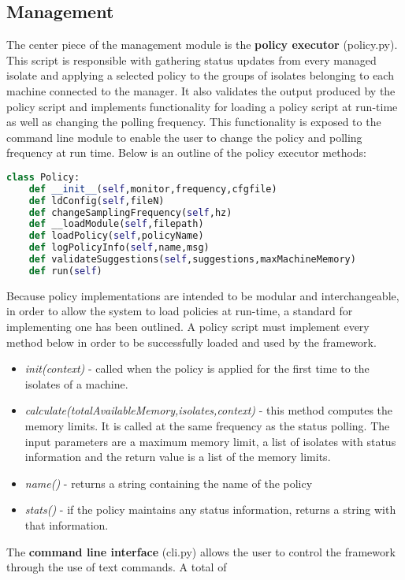 \documentclass{l4proj}
\begin{document}
\subsection{Management}
\hspace*{3em} The center piece of the management module is the \textbf{policy executor} (policy.py). This script is responsible with gathering status updates from every managed isolate and applying a selected policy to the groups of isolates belonging to each machine connected to the manager. It also validates the output produced by the policy script and implements functionality for loading a policy script at run-time as well as changing the polling frequency. This functionality is exposed to the command line module to enable the user to change the policy and polling frequency at run time. Below is an outline of the policy executor methods:
\begin{lstlisting}[language=python]
class Policy:
    def __init__(self,monitor,frequency,cfgfile)
    def ldConfig(self,fileN)
    def changeSamplingFrequency(self,hz)
    def __loadModule(self,filepath)
    def loadPolicy(self,policyName)
    def logPolicyInfo(self,name,msg)
    def validateSuggestions(self,suggestions,maxMachineMemory)
    def run(self)
\end{lstlisting}
\hspace*{3em} Because policy implementations are intended to be modular and interchangeable, in order to allow the system to load policies at run-time, a standard for implementing one has been outlined. A policy script must implement every method below in order to be successfully loaded and used by the framework. 
\begin{itemize}
\item \textit{init(context)} - called when the policy is applied for the first time to the isolates of a machine.
\item \textit{calculate(totalAvailableMemory,isolates,context)} - this method computes the memory limits. It is called at the same frequency as the status polling. The input parameters are a maximum memory limit, a list of isolates with status information and the return value is a list of the memory limits.
\item \textit{name()} - returns a string containing the name of the policy
\item \textit{stats()} - if the policy maintains any status information, returns a string with that information.
\end{itemize}
\hspace*{3em} The \textbf{command line interface} (cli.py) allows the user to control the framework through the use of text commands. A total of  
\end{document}
